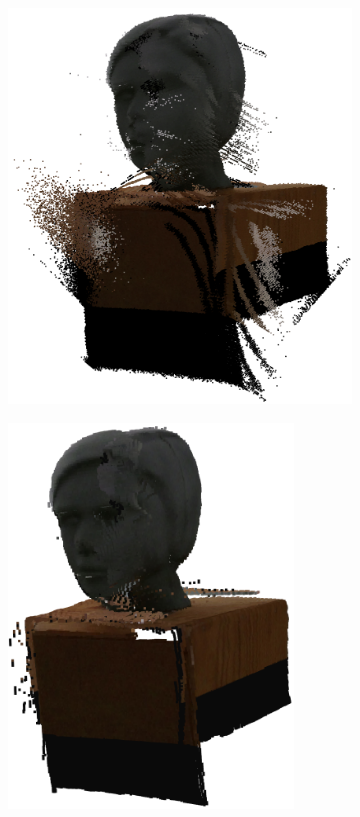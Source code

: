   
\begin{figure}[H]
	\centering
	\begin{subfigure}[b]{0.32\textwidth}
		\centering
		\includegraphics[width=\textwidth]{figures/model_input.png}
		\caption{}
		\label{fig:model:input}
	\end{subfigure}
	\hfill
	\begin{subfigure}[b]{0.32\textwidth}
		\centering
		\includegraphics[width=0.83\textwidth]{figures/model_orig.png}

\end{subfigure}
\end{figure}
